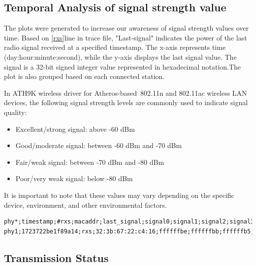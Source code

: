 \subsection{Temporal Analysis of signal strength value}
\label{RSSI}
The plots were generated to increase our awareness of signal strength values over time. Based on \ref{rxs}line in trace file, "Last-signal" indicates the power of the last radio signal received at a specified timestamp. 
The x-axis represents time (day:hour:minute:second), while the y-axis displays the last signal value. The signal is a 32-bit signed integer value represented in hexadecimal notation.The plot is also grouped based on each connected station.

In ATH9K wireless driver for Atheros-based~802.11n and 802.11ac wireless LAN devices, the following signal strength levels are commonly used to indicate signal quality:
\begin{itemize}
    \item Excellent/strong signal: above -60 dBm
    \item Good/moderate signal: between -60 dBm and -70 dBm
    \item Fair/weak signal: between -70 dBm and -80 dBm
    \item Poor/very weak signal: below -80 dBm
\end{itemize}
It is important to note that these values may vary depending on the specific device, environment, and other environmental factors.
\vspace{0.5cm}

\begin{lstlisting}[basicstyle=\small]
phy*;timestamp;#rxs;macaddr;last_signal;signal0;signal1;signal2;signal3
phy1;1723722be1f89a14;rxs;32:3b:67:22:c4:16;ffffffbe;ffffffbb;ffffffb5;7f;7f
\end{lstlisting}



\subsection{Transmission Status }
\label{sec:Analysis and Optimization:Implementation of an Analysis Tool:attempt-count}

